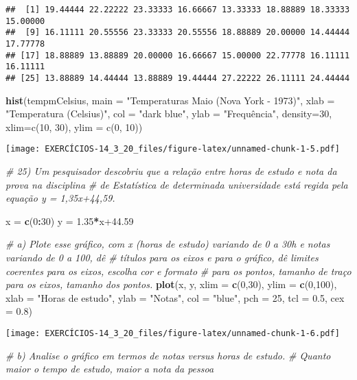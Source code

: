 \documentclass[]{article}
\newenvironment{Shaded}{\begin{snugshade}}{\end{snugshade}}
\newcommand{\CommentTok}[1]{\textcolor[rgb]{0.56,0.35,0.01}{\textit{#1}}}
\newcommand{\DataTypeTok}[1]{\textcolor[rgb]{0.13,0.29,0.53}{#1}}
\newcommand{\DecValTok}[1]{\textcolor[rgb]{0.00,0.00,0.81}{#1}}
\newcommand{\FloatTok}[1]{\textcolor[rgb]{0.00,0.00,0.81}{#1}}
\newcommand{\KeywordTok}[1]{\textcolor[rgb]{0.13,0.29,0.53}{\textbf{#1}}}
\newcommand{\NormalTok}[1]{#1}
\newcommand{\OperatorTok}[1]{\textcolor[rgb]{0.81,0.36,0.00}{\textbf{#1}}}
\newcommand{\StringTok}[1]{\textcolor[rgb]{0.31,0.60,0.02}{#1}}
\begin{document}
\begin{verbatim}
##  [1] 19.44444 22.22222 23.33333 16.66667 13.33333 18.88889 18.33333 15.00000
##  [9] 16.11111 20.55556 23.33333 20.55556 18.88889 20.00000 14.44444 17.77778
## [17] 18.88889 13.88889 20.00000 16.66667 15.00000 22.77778 16.11111 16.11111
## [25] 13.88889 14.44444 13.88889 19.44444 27.22222 26.11111 24.44444
\end{verbatim}

\begin{Shaded}
\begin{Highlighting}[]
\KeywordTok{hist}\NormalTok{(tempmCelsius,}
     \DataTypeTok{main =} \StringTok{"Temperaturas Maio (Nova York - 1973)"}\NormalTok{,}
     \DataTypeTok{xlab =} \StringTok{"Temperatura (Celsius)"}\NormalTok{,}
     \DataTypeTok{col =} \StringTok{"dark blue"}\NormalTok{,}
     \DataTypeTok{ylab =} \StringTok{"Frequência",}
\StringTok{     density=30,}
\StringTok{     xlim=c(10, 30),}
\StringTok{     ylim = c(0, 10))}
\end{Highlighting}
\end{Shaded}

\texttt{[image: EXERCÍCIOS-14\_3\_20\_files/figure-latex/unnamed-chunk-1-5.pdf]}

\begin{Shaded}
\begin{Highlighting}[]
\CommentTok{# 25) Um pesquisador descobriu que a relação entre horas de estudo e nota da prova na disciplina}
\CommentTok{# de Estatística de determinada universidade está regida pela equação y = 1,35x+44,59.}

\NormalTok{x =}\StringTok{ }\KeywordTok{c}\NormalTok{(}\DecValTok{0}\OperatorTok{:}\DecValTok{30}\NormalTok{)}
\NormalTok{y =}\StringTok{ }\FloatTok{1.35}\OperatorTok{*}\NormalTok{x}\FloatTok{+44.59}

\CommentTok{# a) Plote esse gráfico, com x (horas de estudo) variando de 0 a 30h e notas variando de 0 a 100, dê}
\CommentTok{# títulos para os eixos e para o gráfico, dê limites coerentes para os eixos, escolha cor e formato}
\CommentTok{# para os pontos, tamanho de traço para os eixos, tamanho dos pontos.}
\KeywordTok{plot}\NormalTok{(x,}
\NormalTok{     y,}
     \DataTypeTok{xlim =} \KeywordTok{c}\NormalTok{(}\DecValTok{0}\NormalTok{,}\DecValTok{30}\NormalTok{),}
     \DataTypeTok{ylim =} \KeywordTok{c}\NormalTok{(}\DecValTok{0}\NormalTok{,}\DecValTok{100}\NormalTok{),}
     \DataTypeTok{xlab =} \StringTok{"Horas de estudo"}\NormalTok{,}
     \DataTypeTok{ylab =} \StringTok{"Notas"}\NormalTok{,}
     \DataTypeTok{col =} \StringTok{"blue"}\NormalTok{,}
     \DataTypeTok{pch =} \DecValTok{25}\NormalTok{,}
     \DataTypeTok{tcl =} \FloatTok{0.5}\NormalTok{,}
     \DataTypeTok{cex =} \FloatTok{0.8}\NormalTok{)}
\end{Highlighting}
\end{Shaded}

\texttt{[image: EXERCÍCIOS-14\_3\_20\_files/figure-latex/unnamed-chunk-1-6.pdf]}

\begin{Shaded}
\begin{Highlighting}[]
\CommentTok{# b) Analise o gráfico em termos de notas versus horas de estudo.}
  \CommentTok{# Quanto maior o tempo de estudo, maior a nota da pessoa}
\end{Highlighting}
\end{Shaded}
\end{document}
